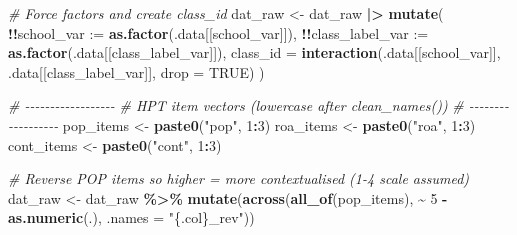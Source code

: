\documentclass[
  10pt,
]{article}
\newenvironment{Shaded}{\begin{snugshade}}{\end{snugshade}}
\newcommand{\AttributeTok}[1]{\textcolor[rgb]{0.13,0.29,0.53}{#1}}
\newcommand{\CommentTok}[1]{\textcolor[rgb]{0.56,0.35,0.01}{\textit{#1}}}
\newcommand{\ConstantTok}[1]{\textcolor[rgb]{0.56,0.35,0.01}{#1}}
\newcommand{\DecValTok}[1]{\textcolor[rgb]{0.00,0.00,0.81}{#1}}
\newcommand{\FunctionTok}[1]{\textcolor[rgb]{0.13,0.29,0.53}{\textbf{#1}}}
\newcommand{\NormalTok}[1]{#1}
\newcommand{\OtherTok}[1]{\textcolor[rgb]{0.56,0.35,0.01}{#1}}
\newcommand{\SpecialCharTok}[1]{\textcolor[rgb]{0.81,0.36,0.00}{\textbf{#1}}}
\newcommand{\StringTok}[1]{\textcolor[rgb]{0.31,0.60,0.02}{#1}}
\begin{document}
\begin{Shaded}
\begin{Highlighting}[]
\CommentTok{\# Force factors and create class\_id}
\NormalTok{dat\_raw }\OtherTok{\textless{}{-}}\NormalTok{ dat\_raw }\SpecialCharTok{|\textgreater{}}
  \FunctionTok{mutate}\NormalTok{(}
    \SpecialCharTok{!!}\AttributeTok{school\_var :=} \FunctionTok{as.factor}\NormalTok{(.data[[school\_var]]),}
    \SpecialCharTok{!!}\AttributeTok{class\_label\_var :=} \FunctionTok{as.factor}\NormalTok{(.data[[class\_label\_var]]),}
    \AttributeTok{class\_id =} \FunctionTok{interaction}\NormalTok{(.data[[school\_var]], .data[[class\_label\_var]], }\AttributeTok{drop =} \ConstantTok{TRUE}\NormalTok{)}
\NormalTok{  )}

\CommentTok{\# {-}{-}{-}{-}{-}{-}{-}{-}{-}{-}{-}{-}{-}{-}{-}{-}{-}{-}}
\CommentTok{\# HPT item vectors (lowercase after clean\_names())}
\CommentTok{\# {-}{-}{-}{-}{-}{-}{-}{-}{-}{-}{-}{-}{-}{-}{-}{-}{-}{-}}
\NormalTok{pop\_items  }\OtherTok{\textless{}{-}} \FunctionTok{paste0}\NormalTok{(}\StringTok{"pop"}\NormalTok{, }\DecValTok{1}\SpecialCharTok{:}\DecValTok{3}\NormalTok{)}
\NormalTok{roa\_items  }\OtherTok{\textless{}{-}} \FunctionTok{paste0}\NormalTok{(}\StringTok{"roa"}\NormalTok{, }\DecValTok{1}\SpecialCharTok{:}\DecValTok{3}\NormalTok{)}
\NormalTok{cont\_items }\OtherTok{\textless{}{-}} \FunctionTok{paste0}\NormalTok{(}\StringTok{"cont"}\NormalTok{, }\DecValTok{1}\SpecialCharTok{:}\DecValTok{3}\NormalTok{)}

\CommentTok{\# Reverse POP items so higher = more contextualised (1{-}4 scale assumed)}
\NormalTok{dat\_raw }\OtherTok{\textless{}{-}}\NormalTok{ dat\_raw }\SpecialCharTok{\%\textgreater{}\%}
  \FunctionTok{mutate}\NormalTok{(}\FunctionTok{across}\NormalTok{(}\FunctionTok{all\_of}\NormalTok{(pop\_items), }\SpecialCharTok{\textasciitilde{}} \DecValTok{5} \SpecialCharTok{{-}} \FunctionTok{as.numeric}\NormalTok{(.), }\AttributeTok{.names =} \StringTok{"\{.col\}\_rev"}\NormalTok{))}
\end{Highlighting}
\end{Shaded}
\end{document}
